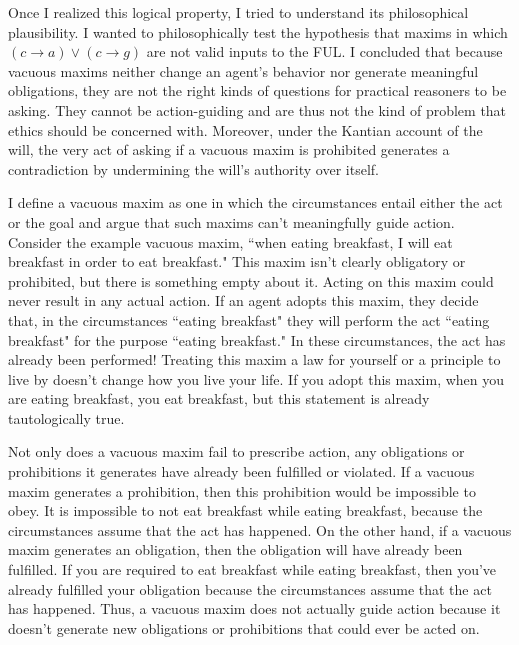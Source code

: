 \begin{isabellebody}
\begin{isamarkuptext}
Once I realized this logical property, I tried to understand its philosophical plausibility. I 
wanted to philosophically test the hypothesis that maxims in which  $(c \longrightarrow a) \vee 
(c \longrightarrow g)$ are not valid inputs to the FUL. I concluded that because vacuous maxims neither 
change an agent's behavior nor generate meaningful obligations, they are not the right kinds of questions 
for practical reasoners to be asking. They cannot be action-guiding and are thus not the kind of problem that 
ethics should be concerned with. Moreover, under the Kantian account of the will, the very act of asking 
if a vacuous maxim is prohibited generates a contradiction by undermining the will's authority over itself. 

I define a vacuous maxim as one in which the circumstances entail either the act or the goal and argue 
that such maxims can't meaningfully guide action. Consider the example vacuous maxim, ``when eating 
breakfast, I will eat breakfast in order to eat breakfast." This 
maxim isn't clearly obligatory or prohibited, but there is something empty about it. Acting on this
 maxim could never result in any actual action. If an agent adopts this maxim, 
they decide that, in the circumstances ``eating breakfast" they will perform the act ``eating breakfast"
for the purpose ``eating breakfast." In these circumstances, the act has 
already been performed! Treating this maxim a law for yourself or a principle to live by doesn't change 
how you live your life. If you adopt this maxim, when you are eating breakfast, you eat breakfast, 
but this statement is already tautologically true. 

Not only does a vacuous maxim fail to prescribe action, any obligations or prohibitions it 
generates have already been fulfilled or violated. If a vacuous 
maxim generates a prohibition, then this prohibition would be impossible to obey. 
It is impossible to not eat breakfast while eating breakfast, because the circumstances assume that the 
act has happened. On the other hand, if a vacuous maxim generates an obligation, then the obligation 
will have already been fulfilled. If you are required to eat breakfast while eating breakfast, then you've 
already fulfilled your obligation because the circumstances assume that the act has happened. Thus, 
a vacuous maxim does not actually guide action because it doesn't generate new obligations or 
prohibitions that could ever be acted on. 


\end{isamarkuptext}
\end{isabellebody}
